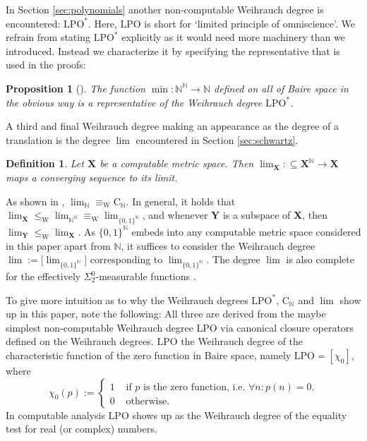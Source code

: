 \documentclass{eptcs-modified}
\newtheorem{definition}[theorem]{Definition}
\newtheorem{proposition}[theorem]{Proposition}
\newcommand{\Wd}[1]{\left[#1\right]}
\newcommand{\Cantor}{{\{0, 1\}^\mathbb{N}}}
\newcommand{\Baire}{{\mathbb{N}^\mathbb{N}}}
\newcommand{\lpo}{\textrm{LPO}}
\newcommand{\leqW}{\leq_{\textrm{W}}}
\newcommand{\equivW}{\equiv_{\textrm{W}}}
\newcommand{\C}{\textrm{C}}
\begin{document}
			In Section \ref{sec:polynomials} another non-computable Weihrauch degree is encountered: $\lpo^*$.
			Here, $\lpo$ is short for \lq limited principle of omniscience\rq.
			We refrain from stating $\lpo^*$ explicitly as it would need more machinery than we introduced.
			Instead we characterize it by specifying the representative that is used in the proofs:
			\begin{proposition}[{\cite[Korollar 3.1.4.6]{paulymaster}}]\label{resu:lpo*}
				The function $\min : \Baire \to \mathbb{N}$ defined on all of Baire space in the obvious way is a representative of the Weihrauch degree $\lpo^*$.
			\end{proposition}

			A third and final Weihrauch degree making an appearance as the degree of a translation is the degree $\lim$ encountered in Section \ref{sec:schwartz}.

			\begin{definition}
				Let $\mathbf{X}$ be a computable metric space.
				Then $\lim_\mathbf{X} : \subseteq \mathbf{X}^\mathbb{N} \to \mathbf{X}$ maps a converging sequence to its limit.
			\end{definition}

			As shown in \cite{MR2915694}, $\lim_\mathbb{N} \equivW \C_\mathbb{N}$.
			In general, it holds that $\lim_\mathbf{X} \leqW \lim_\Baire \equivW \lim_\Cantor$, and whenever $\mathbf{Y}$ is a subspace of $\mathbf{X}$, then $\lim_\mathbf{Y} \leqW \lim_\mathbf{X}$.
			As $\Cantor$ embeds into any computable metric space considered in this paper apart from $\mathbb{N}$, it suffices to consider the Weihrauch degree $\lim:=\big[{\lim_\Cantor}\big]$ corresponding to $\lim_\Cantor$.
			The degree $\lim$ is also complete for the effectively $\Sigma^0_2$-measurable functions \cite{MR2099383,pauly-descriptive}.

			To give more intuition as to why the Weihrauch degrees $\lpo^*$, $\C_\mathbb{N}$ and $\lim$ show up in this paper, note the following:
			All three are derived from the maybe simplest non-computable Weihrauch degree $\lpo$ via canonical closure operators defined on the Weihrauch degrees.
			$\lpo$ the Weihrauch degree of the characteristic function of the zero function in Baire space, namely $\lpo = \Wd{\chi_0}$, where
			\[ \chi_0(p) :=\begin{cases} 1 & \text{ if $p$ is the zero function, i.e. }\forall n:p(n)=0. \\ 0 & \text{ otherwise.} \end{cases} \]
			In computable analysis $\lpo$ shows up as the Weihrauch degree of the equality test for real (or complex) numbers.
\end{document}

